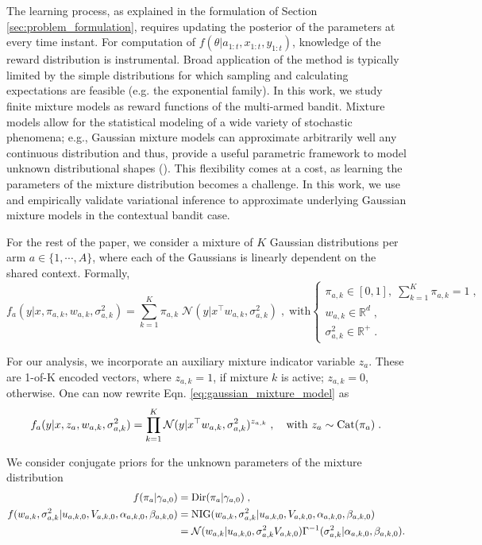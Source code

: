 \documentclass[10pt]{article}
\def \Real{{\mathbb R}}
\newcommand{\eg}{e.g. }
\newcommand{\N}{\mathcal{N}}
\newcommand{\Dir}{{\rm Dir}}
\newcommand{\Cat}{{\rm Cat}}
\newcommand{\NIG}{{\rm NIG}}
\begin{document}
The learning process, as explained in the formulation of Section \ref{sec:problem_formulation}, requires updating the posterior of the parameters at every time instant. For computation of $f(\theta|a_{1:t}, x_{1:t}, y_{1:t})$, knowledge of the reward distribution is instrumental. Broad application of the method is typically limited by the simple distributions for which sampling and calculating expectations are feasible (\eg the exponential family). In this work, we study finite mixture models as reward functions of the multi-armed bandit. Mixture models allow for the statistical modeling of a wide variety of stochastic phenomena; e.g., Gaussian mixture models can approximate arbitrarily well any continuous distribution and thus, provide a useful parametric framework to model unknown distributional shapes (\cite{b-McLachlan2004}). This flexibility comes at a cost, as learning the parameters of the mixture distribution becomes a challenge. In this work, we use and empirically validate variational inference to approximate underlying Gaussian mixture models in the contextual bandit case.

For the rest of the paper, we consider a mixture of $K$ Gaussian distributions per arm $a \in \{1, \cdots, A\}$, where each of the Gaussians is linearly dependent on the shared context. Formally,
\begin{equation}
f_a(y|x,\pi_{a,k}, w_{a,k}, \sigma_{a,k}^2) =\sum_{k=1}^K \pi_{a,k} \; \N(y|x^\top w_{a,k}, \sigma_{a,k}^2)  \;,
\; \text{with} \begin{cases}
\pi_{a,k}\in [0,1], \; \sum_{k=1}^K \pi_{a,k} = 1 \;,  \\
w_{a,k}\in \Real^{d} \;, \\
\sigma_{a,k}^2\in \Real^+ \;.
\end{cases}
\label{eq:gaussian_mixture_model}
\end{equation}

For our analysis, we incorporate an auxiliary mixture indicator variable $z_a$. These are 1-of-K encoded vectors, where $z_{a,k}=1$, if mixture $k$ is active; $z_{a,k}=0$, otherwise. One can now rewrite Eqn. \ref{eq:gaussian_mixture_model} as
\begin{equation}
f_a(y|x,z_{a},w_{a,k}, \sigma_{a,k}^2) =\prod_{k=1}^K \N(y|x^\top w_{a,k}, \sigma_{a,k}^2)^{z_{a,k}} \;, \quad \text{with } z_{a} \sim \Cat(\pi_{a}) \; .
\label{eq:gaussian_mixture_model_z}
\end{equation}

We consider conjugate priors for the unknown parameters of the mixture distribution
\begin{equation}
\begin{split}
f(\pi_{a}|\gamma_{a,0}) &=\Dir(\pi_a|\gamma_{a,0}) \; ,\\
f(w_{a,k}, \sigma_{a,k}^2|u_{a,k,0}, V_{a,k,0},\alpha_{a,k,0}, \beta_{a,k,0}) &= \NIG(w_{a,k}, \sigma_{a,k}^2 |u_{a,k,0}, V_{a,k,0},\alpha_{a,k,0}, \beta_{a,k,0}) \\
&= \N(w_{a,k}|u_{a,k,0}, \sigma_{a,k}^2V_{a,k,0}) \Gamma^{-1}(\sigma_{a,k}^2|\alpha_{a,k,0}, \beta_{a,k,0}). \\
\end{split}
\label{eq:mixture_model_conjugate_priors}
\end{equation}
\end{document}
